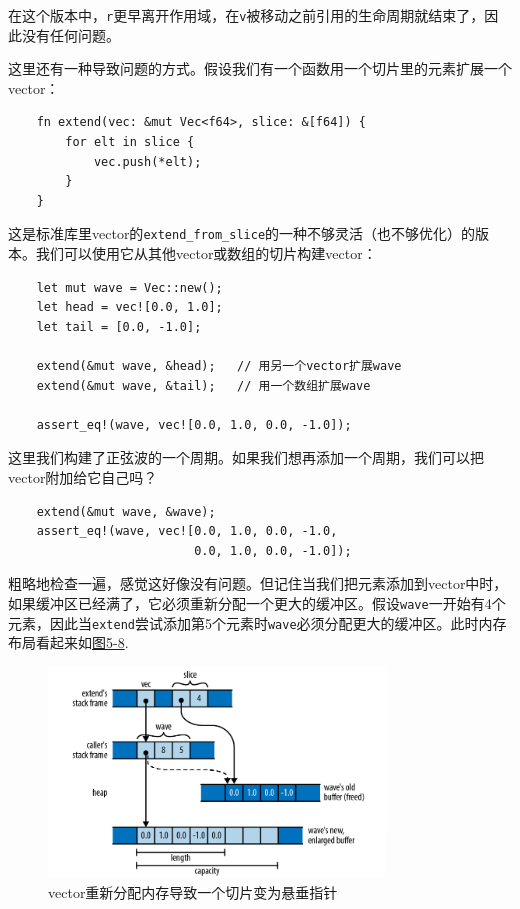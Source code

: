 在这个版本中，\texttt{r}更早离开作用域，在\texttt{v}被移动之前引用的生命周期就结束了，因此没有任何问题。

这里还有一种导致问题的方式。假设我们有一个函数用一个切片里的元素扩展一个vector：
\begin{verbatim}
    fn extend(vec: &mut Vec<f64>, slice: &[f64]) {
        for elt in slice {
            vec.push(*elt);
        }
    }
\end{verbatim}

这是标准库里vector的\texttt{extend\_from\_slice}的一种不够灵活（也不够优化）的版本。我们可以使用它从其他vector或数组的切片构建vector：
\begin{verbatim}
    let mut wave = Vec::new();
    let head = vec![0.0, 1.0];
    let tail = [0.0, -1.0];

    extend(&mut wave, &head);   // 用另一个vector扩展wave
    extend(&mut wave, &tail);   // 用一个数组扩展wave

    assert_eq!(wave, vec![0.0, 1.0, 0.0, -1.0]);
\end{verbatim}

这里我们构建了正弦波的一个周期。如果我们想再添加一个周期，我们可以把vector附加给它自己吗？
\begin{verbatim}
    extend(&mut wave, &wave);
    assert_eq!(wave, vec![0.0, 1.0, 0.0, -1.0,
                          0.0, 1.0, 0.0, -1.0]);
\end{verbatim}

粗略地检查一遍，感觉这好像没有问题。但记住当我们把元素添加到vector中时，如果缓冲区已经满了，它必须重新分配一个更大的缓冲区。假设\texttt{wave}一开始有4个元素，因此当\texttt{extend}尝试添加第5个元素时\texttt{wave}必须分配更大的缓冲区。此时内存布局看起来如\hyperref[f5-8]{图5-8}.

\begin{figure}[htbp]
    \centering
    \includegraphics[width=0.8\textwidth]{../img/f5-8.png}
    \caption{vector重新分配内存导致一个切片变为悬垂指针}
    \label{f5-8}
\end{figure}

